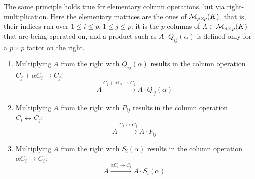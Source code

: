 \begin{importantremark}
\label{rem:column_operations}
The same principle holds true for elementary column operations, but via right-multiplication.
Here the elementary matrices are the ones of $\mathcal{M}_{p \times p}(K)$, that is, their indices run over $1 \le i \le p$, $1 \le j \le p$: it is the $p$ columns of $A \in \mathcal{M}_{n \times p}(K)$ that are being operated on, and a product such as $A \cdot Q_{ij}(\alpha)$ is defined only for a $p \times p$ factor on the right.
\begin{enumerate}[label=\textbf{(\alph*')}]
    \item Multiplying $A$ from the right with $Q_{ij}(\alpha)$ results in the column operation $C_j + \alpha C_i \longrightarrow C_j$:
    \begin{equation*}
        A \xrightarrow{C_j + \alpha C_i \longrightarrow C_j} A \cdot Q_{ij}(\alpha)
    \end{equation*}
    \item Multiplying $A$ from the right with $P_{ij}$ results in the column operation $C_i \leftrightarrow C_j$:
    \begin{equation*}
        A \xrightarrow{C_i \leftrightarrow C_j} A \cdot P_{ij}
    \end{equation*}
    \item Multiplying $A$ from the right with $S_i(\alpha)$ results in the column operation $\alpha C_i \longrightarrow C_i$:
    \begin{equation*}
        A \xrightarrow{\alpha C_i \longrightarrow C_i} A \cdot S_i(\alpha)
    \end{equation*}
\end{enumerate}
\end{importantremark}

